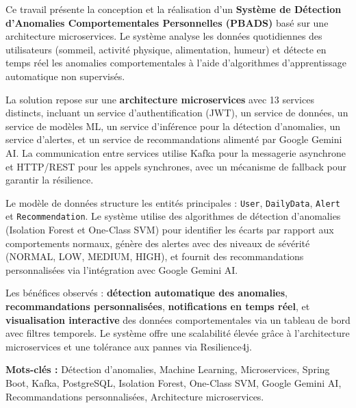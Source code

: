 Ce travail présente la conception et la réalisation d'un \textbf{Système de Détection d'Anomalies Comportementales Personnelles (PBADS)} basé sur une architecture microservices. Le système analyse les données quotidiennes des utilisateurs (sommeil, activité physique, alimentation, humeur) et détecte en temps réel les anomalies comportementales à l'aide d'algorithmes d'apprentissage automatique non supervisés.

La solution repose sur une \textbf{architecture microservices} avec 13 services distincts, incluant un service d'authentification (JWT), un service de données, un service de modèles ML, un service d'inférence pour la détection d'anomalies, un service d'alertes, et un service de recommandations alimenté par Google Gemini AI. La communication entre services utilise Kafka pour la messagerie asynchrone et HTTP/REST pour les appels synchrones, avec un mécanisme de fallback pour garantir la résilience.

Le modèle de données structure les entités principales : \texttt{User}, \texttt{DailyData}, \texttt{Alert} et \texttt{Recommendation}. Le système utilise des algorithmes de détection d'anomalies (Isolation Forest et One-Class SVM) pour identifier les écarts par rapport aux comportements normaux, génère des alertes avec des niveaux de sévérité (NORMAL, LOW, MEDIUM, HIGH), et fournit des recommandations personnalisées via l'intégration avec Google Gemini AI.

Les bénéfices observés : \textbf{détection automatique des anomalies}, \textbf{recommandations personnalisées}, \textbf{notifications en temps réel}, et \textbf{visualisation interactive} des données comportementales via un tableau de bord avec filtres temporels. Le système offre une scalabilité élevée grâce à l'architecture microservices et une tolérance aux pannes via Resilience4j.

\textbf{Mots-clés :} Détection d'anomalies, Machine Learning, Microservices, Spring Boot, Kafka, PostgreSQL, Isolation Forest, One-Class SVM, Google Gemini AI, Recommandations personnalisées, Architecture microservices.
